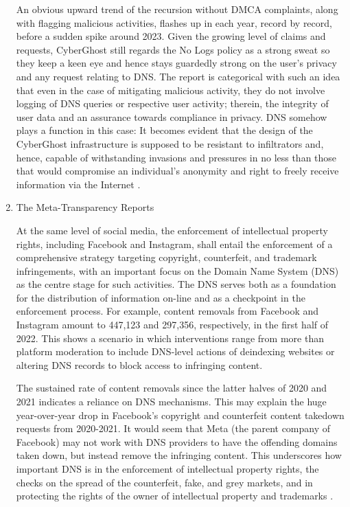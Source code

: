 \begin{enumerate}
An obvious upward trend of the recursion without DMCA complaints, along with flagging malicious activities, flashes up in each year, record by record, before a sudden spike around 2023. Given the growing level of claims and requests, CyberGhost still regards the No Logs policy as a strong sweat so they keep a keen eye and hence stays guardedly strong on the user's privacy and any request relating to DNS. The report is categorical with such an idea that even in the case of mitigating malicious activity, they do not involve logging of DNS queries or respective user activity; therein, the integrity of user data and an assurance towards compliance in privacy. DNS somehow plays a function in this case: It becomes evident that the design of the CyberGhost infrastructure is supposed to be resistant to infiltrators and, hence, capable of withstanding invasions and pressures in no less than those that would compromise an individual's anonymity and right to freely receive information via the Internet \cite{CyberGhostVPN2023}.

\item The Meta-Transparency Reports

At the same level of social media, the enforcement of intellectual property rights, including Facebook and Instagram, shall entail the enforcement of a comprehensive strategy targeting copyright, counterfeit, and trademark infringements, with an important focus on the Domain Name System (DNS) as the centre stage for such activities. The DNS serves both as a foundation for the distribution of information on-line and as a checkpoint in the enforcement process. For example, content removals from Facebook and Instagram amount to 447,123 and 297,356, respectively, in the first half of 2022. This shows a scenario in which interventions range from more than platform moderation to include DNS-level actions of deindexing websites or altering DNS records to block access to infringing content.

The sustained rate of content removals since the latter halves of 2020 and 2021 indicates a reliance on DNS mechanisms. This may explain the huge year-over-year drop in Facebook's copyright and counterfeit content takedown requests from 2020-2021. It would seem that Meta (the parent company of Facebook) may not work with DNS providers to have the offending domains taken down, but instead remove the infringing content. This underscores how important DNS is in the enforcement of intellectual property rights, the checks on the spread of the counterfeit, fake, and grey markets, and in protecting the rights of the owner of intellectual property and trademarks  \cite{Facebook2023}.


\end{enumerate}
